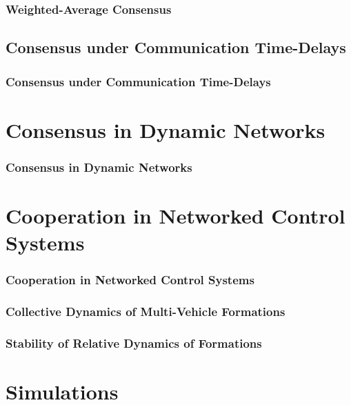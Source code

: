 \documentclass{beamer}
\begin{document}
\begin{frame}
\frametitle{Weighted-Average Consensus}

\end{frame}

\subsection{Consensus under Communication Time-Delays}

\begin{frame}
\frametitle{Consensus under Communication Time-Delays}

\end{frame}


\section{Consensus in Dynamic Networks}

\begin{frame}
\frametitle{Consensus in Dynamic Networks}


\end{frame}

\section{Cooperation in Networked Control Systems}

\begin{frame}
\frametitle{Cooperation in Networked Control Systems}


\end{frame}

\begin{frame}
\frametitle{Collective Dynamics of Multi-Vehicle Formations}

\end{frame}

\begin{frame}
\frametitle{Stability of Relative Dynamics of Formations}

\end{frame}

\section{Simulations}
\end{document}
